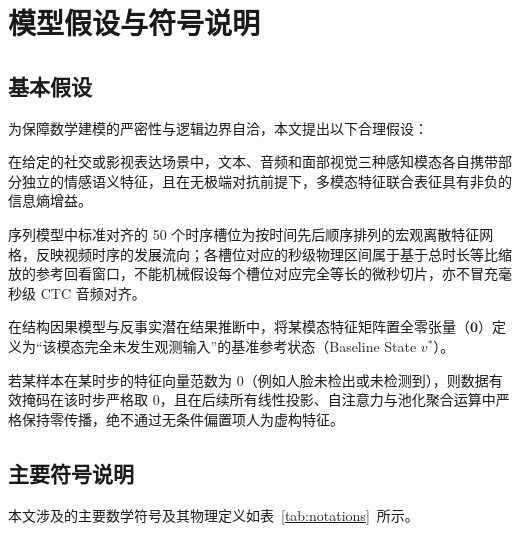 \documentclass{huawei-mcm}
\begin{document}
\chapter{模型假设与符号说明}

\section{基本假设}
为保障数学建模的严密性与逻辑边界自洽，本文提出以下合理假设：
\begin{assumption}[模态条件互补假设]
  在给定的社交或影视表达场景中，文本、音频和面部视觉三种感知模态各自携带部分独立的情感语义特征，且在无极端对抗前提下，多模态特征联合表征具有非负的信息熵增益。
\end{assumption}

\begin{assumption}[离散槽位准单调映射假设]
  序列模型中标准对齐的 50 个时序槽位为按时间先后顺序排列的宏观离散特征网格，反映视频时序的发展流向；各槽位对应的秒级物理区间属于基于总时长等比缩放的参考回看窗口，不能机械假设每个槽位对应完全等长的微秒切片，亦不冒充毫秒级 CTC 音频对齐。
\end{assumption}

\begin{assumption}[零基准因果参考态假设]
  在结构因果模型与反事实潜在结果推断中，将某模态特征矩阵置全零张量（$\mathbf{0}$）定义为“该模态完全未发生观测输入”的基准参考状态（Baseline State $v^*$）。
\end{assumption}

\begin{assumption}[数据层客观掩码守恒假设]
  若某样本在某时步的特征向量范数为 0（例如人脸未检出或未检测到），则数据有效掩码在该时步严格取 0，且在后续所有线性投影、自注意力与池化聚合运算中严格保持零传播，绝不通过无条件偏置项人为虚构特征。
\end{assumption}

\section{主要符号说明}
本文涉及的主要数学符号及其物理定义如表~\ref{tab:notations}~所示。
\end{document}
